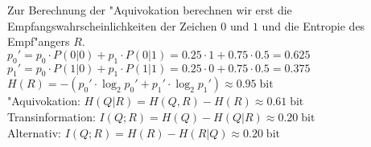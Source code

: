 \documentclass[10pt,oneside,onecolumn,a4paper,german,titlepage]{article}
\begin{document}
\begin{enumerate}
Zur Berechnung der "Aquivokation berechnen wir erst die Empfangswahrscheinlichkeiten
der Zeichen $0$ und $1$ und die Entropie des Empf"angers $R$.\\
$p_0' = p_0 \cdot P(0|0) + p_1 \cdot P(0|1) = 0.25 \cdot 1 + 0.75 \cdot 0.5 =
0.625$\\
$p_1' = p_0 \cdot P(1|0) + p_1 \cdot P(1|1) = 0.25 \cdot 0 + 0.75 \cdot 0.5 =
0.375$\\
$H(R) = -(p_0' \cdot \log_2{p_0'} + p_1' \cdot \log_2{p_1'}) \approx
0.95 \; \mbox{bit}$\\
"Aquivokation: $H(Q|R) = H(Q,R) - H(R) \approx 0.61 \; \mbox{bit}$\\
Transinformation: $I(Q;R) = H(Q) - H(Q|R) \approx 0.20 \; \mbox{bit}$\\
Alternativ: $I(Q;R) = H(R) - H(R|Q) \approx 0.20 \; \mbox{bit}$
\end{enumerate}
\end{document}
